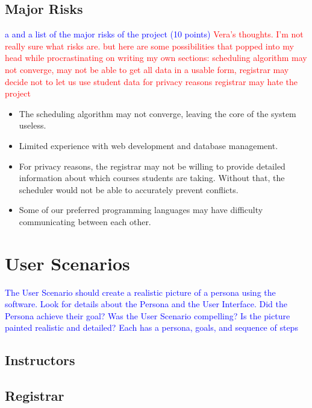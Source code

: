 \documentclass[11pt]{article}
\begin{document}
\subsection{Major Risks} %
\textcolor{blue}{a and a list of the major risks of the project (10 points)}
\textcolor{red}{Vera's thoughts. I'm not really sure what risks are. but here are some possibilities that popped into my head while procrastinating on writing my own sections:
scheduling algorithm may not converge,
may not be able to get all data in a usable form,
registrar may decide not to let us use student data for privacy reasons 
registrar may hate the project}
\begin{itemize}
\item The scheduling algorithm may not converge, leaving the core of the system useless.
\item Limited experience with web development and database management.
\item For privacy reasons, the registrar may not be willing to provide detailed information about which courses students are taking. Without that, the scheduler would not be able to accurately prevent conflicts.
\item Some of our preferred programming languages may have difficulty communicating between each other. %
\end{itemize}


\section{User Scenarios}  %
\textcolor{blue}{The User Scenario should create a realistic picture of a persona using the software.  
Look for details about the Persona and the User Interface.  
Did the Persona achieve their goal?  
Was the User Scenario compelling?  
Is the picture painted realistic and detailed?
Each has a persona, goals, and sequence of steps}
\subsection{Instructors} %
\subsection{Registrar}  %
\end{document}
